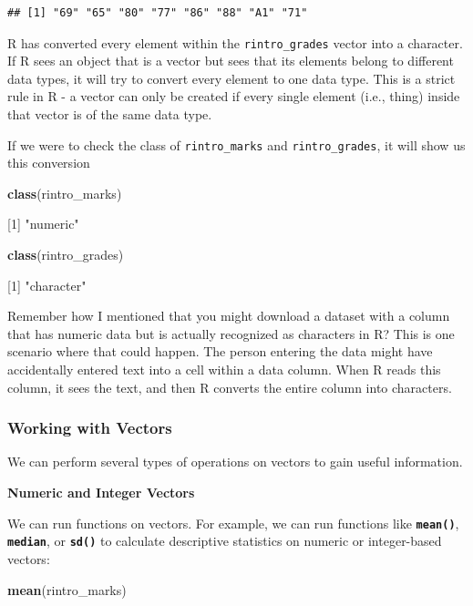 \documentclass[
]{book}
\newenvironment{Shaded}{\begin{snugshade}}{\end{snugshade}}
\newcommand{\DecValTok}[1]{\textcolor[rgb]{0.00,0.00,0.81}{#1}}
\newcommand{\FunctionTok}[1]{\textcolor[rgb]{0.13,0.29,0.53}{\textbf{#1}}}
\newcommand{\NormalTok}[1]{#1}
\newcommand{\StringTok}[1]{\textcolor[rgb]{0.31,0.60,0.02}{#1}}
\begin{document}
\begin{verbatim}
## [1] "69" "65" "80" "77" "86" "88" "A1" "71"
\end{verbatim}

R has converted every element within the \texttt{rintro\_grades} vector into a character. If R sees an object that is a vector but sees that its elements belong to different data types, it will try to convert every element to one data type. This is a strict rule in R - a vector can only be created if every single element (i.e., thing) inside that vector is of the same data type.

If we were to check the class of \texttt{rintro\_marks} and \texttt{rintro\_grades}, it will show us this conversion

\begin{Shaded}
\begin{Highlighting}[]
\FunctionTok{class}\NormalTok{(rintro\_marks) }

\NormalTok{[}\DecValTok{1}\NormalTok{] }\StringTok{"numeric"}


\FunctionTok{class}\NormalTok{(rintro\_grades)}

\NormalTok{[}\DecValTok{1}\NormalTok{] }\StringTok{"character"}
\end{Highlighting}
\end{Shaded}

Remember how I mentioned that you might download a dataset with a column that has numeric data but is actually recognized as characters in R? This is one scenario where that could happen. The person entering the data might have accidentally entered text into a cell within a data column. When R reads this column, it sees the text, and then R converts the entire column into characters.

\hypertarget{working-with-vectors}{%
\subsubsection{Working with Vectors}\label{working-with-vectors}}

We can perform several types of operations on vectors to gain useful information.

\textbf{Numeric and Integer Vectors}

We can run functions on vectors. For example, we can run functions like \textbf{\texttt{mean()}}, \textbf{\texttt{median}}, or \textbf{\texttt{sd()}} to calculate descriptive statistics on numeric or integer-based vectors:

\begin{Shaded}
\begin{Highlighting}[]
\FunctionTok{mean}\NormalTok{(rintro\_marks)}
\end{Highlighting}
\end{Shaded}
\end{document}
